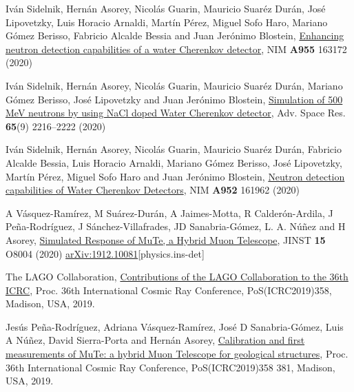 \begin{etaremune}
\item {} Iván Sidelnik, Hernán Asorey, Nicolás Guarin, Mauricio Suaréz Durán, José Lipovetzky, Luis Horacio Arnaldi, Martín Pérez, Miguel Sofo Haro, Mariano Gómez Berisso, Fabricio Alcalde Bessia and Juan Jerónimo Blostein, \href{https://doi.org/10.1016/j.nima.2019.163172}{{Enhancing neutron detection capabilities of a water Cherenkov detector}}, NIM {\textbf{A955}} 163172 (2020) %

\item {} Iván Sidelnik, Hernán Asorey, Nicolás Guarin, Mauricio Suaréz Durán, Mariano Gómez Berisso, José Lipovetzky and Juan Jerónimo Blostein, \href{https://doi.org/10.1016/j.asr.2020.02.024}{{Simulation of 500 MeV neutrons by using NaCl doped Water Cherenkov detector}}, Adv.
Space Res. {\textbf{65}}(9) 2216--2222 (2020) %

\item {} Iván Sidelnik, Hernán Asorey, Nicolás Guarin, Mauricio Suaréz Durán, Fabricio Alcalde Bessia, Luis Horacio Arnaldi, Mariano Gómez Berisso, José Lipovetzky, Martín Pérez, Miguel Sofo Haro and Juan Jerónimo Blostein, \href{https://doi.org/10.1016/j.nima.2019.03.017}{{Neutron detection capabilities of Water Cherenkov Detectors}}, NIM {\textbf{A952}} 161962 (2020) %

\item {} A Vásquez-Ramírez, M Suárez-Durán, A Jaimes-Motta, R Calderón-Ardila, J Peña-Rodríguez, J Sánchez-Villafrades, JD Sanabria-Gómez, L. A. Núñez and H Asorey, \href{https://doi.org/10.1088/1748-0221/15/08/P08004}{{Simulated Response of MuTe, a Hybrid Muon Telescope}}, JINST {\textbf{15}} O8004 (2020) \href{https://arxiv.org/abs/1912.10081}{arXiv:1912.10081}[physics.ins-det]

\item {} The LAGO Collaboration, \href{https://arxiv.org/abs/1909.10039}{Contributions of the LAGO Collaboration to the 36th ICRC}, \en Proc.
36th International Cosmic Ray Conference, PoS(ICRC2019)358, Madison, USA, 2019. %

\item {} Jesús Peña-Rodríguez, Adriana Vásquez-Ramírez, José D Sanabria-Gómez, Luis A Núñez, David Sierra-Porta and Hernán Asorey, \href{https://pos.sissa.it/358/381/}{Calibration and first measurements of MuTe: a hybrid Muon Telescope for geological structures}, \en Proc.
36th International Cosmic Ray Conference, PoS(ICRC2019)358 381, Madison, USA, 2019. %


\end{etaremune}

